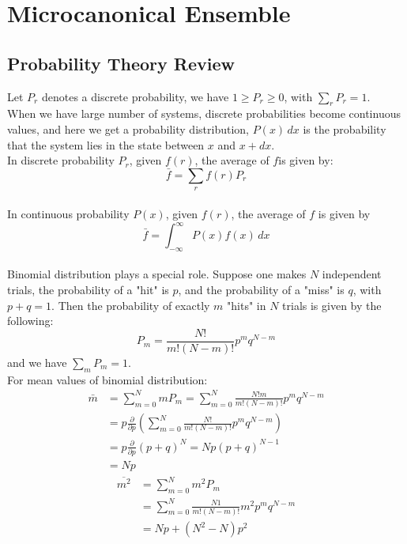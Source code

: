 \documentclass[11pt,oneside]{book}
\theoremstyle{break}
\theoremstyle{break}
\begin{document}
\tableofcontents
{}


\newpage
\setcounter{chapter}{0}
\chapter{Microcanonical Ensemble}
\section[Probability Theory Review]{\color{red}Probability Theory Review\color{black}}
Let $P_r$ denotes a discrete probability, we have $1\geq P_r \geq 0$, with $\sum_r P_r = 1$.\\

When we have large number of systems, discrete probabilities become continuous values, and here we get a probability distribution, $P(x)\, dx$ is the probability that the system lies in the state between $x$ and $x+ dx$. \\


In discrete probability $P_r$, given $f(r)$, the average of $f$is given by: $$\bar{f} = \sum_r f(r) P_r$$\\
In continuous probability $P(x)$, given $f(r)$, the average of $f$ is given by $$\bar{f} = \int_{-\infty}^\infty P(x) f(x)\, dx$$ \\

Binomial distribution plays a special role. Suppose one makes $N$ independent trials, the probability of a "hit" is $p$, and the probability of a "miss" is $q$, with $p+q = 1$. Then the probability of exactly $m$ "hits" in $N$ trials is given by the following:
$$P_m = \frac{N!}{m!(N-m)!}p^m q^{N-m}$$
and we have $\sum_m P_m = 1$.\\


For mean values of binomial distribution:
\begin{align*}
\bar m &= \sum_{m=0}^N mP_m = \sum_{m=0}^N \frac{N! m}{m!(N-m)!}p^mq^{N-m} \\
&= p\frac{\partial }{\partial p} \left(\sum_{m=0}^N \frac{N!}{m!(N-m)!}p^m q^{N-m} \right)\\ 
&= p\frac{\partial}{\partial p}(p+q)^N = Np(p+q)^{N-1}\\
&= Np
\end{align*}
\begin{align*}
\overline{m^2} &= \sum_{m=0}^N m^2 P_m \\
&= \sum_{m=0}^N \frac{N1}{m!(N-m)!}m^2p^mq^{N-m}\\
&= Np+(N^2-N)p^2
\end{align*}
\end{document}
